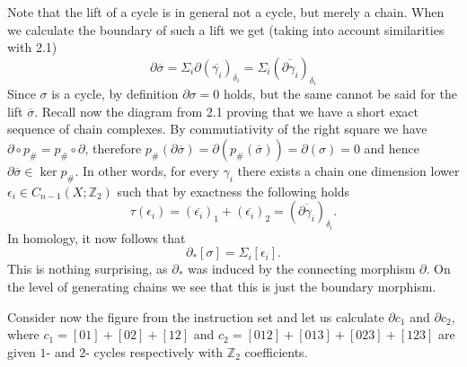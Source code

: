 \documentclass[a4paper, 12pt]{article}
\newcommand{\Z}{\mathbb{Z}}
\begin{document}
\begin{enumerate}
	Note that the lift of a cycle is in general not a cycle, but merely a chain.
	When we calculate the boundary of such a lift we get (taking into account similarities with 2.1)
	\[
	\partial\overline{\sigma} = \Sigma_i\partial(\overline{\gamma_i})_{\delta_i} = \Sigma_i (\overline{\partial\gamma_i})_{\delta_i}
	\]
	Since $\sigma$ is a cycle, by definition $\partial\sigma = 0$ holds, but the same cannot be said for the lift $\overline{\sigma}$. Recall now the diagram from 2.1 proving that we have a short exact sequence of chain complexes. By commutiativity of the right square we have $\partial\circ p_\# = p_\# \circ \partial$, therefore $p_\#(\partial\overline{\sigma}) = \partial(p_\#(\overline{\sigma})) = \partial(\sigma) = 0$ and hence $\partial\overline{\sigma} \in \ker p_\#$. In other words, for every $\gamma_i$ there exists a chain one dimension lower $\epsilon_i \in C_{n-1}(X;\Z_2)$ such that by exactness the following holds
	\[
	\tau(\epsilon_i) = (\overline{\epsilon_i})_1 + (\overline{\epsilon_i})_2 = (\overline{\partial\gamma_i})_{\delta_i}.
	\]
	In homology, it now follows that
	\[
	\partial_*[\sigma] = \Sigma_i[\epsilon_i].
	\]
	This is nothing surprising, as $\partial_*$ was induced by the connecting morphism $\partial$. On the level of generating chains we see that this is just the boundary morphism.
	
	Consider now the figure from the instruction set and let us calculate $\partial c_1$ and $\partial c_2$, where $c_1 = [01] + [02] + [12]$ and $c_2 = [012] + [013] + [023] + [123]$ are given $1$- and $2$- cycles respectively with $\Z_2$ coefficients.
	

\end{enumerate}
\end{document}
